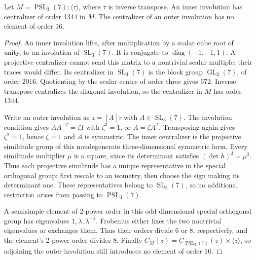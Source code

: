 \begin{lemma}\label{centralizers}
Let $M=\operatorname{PSL}_3(7):\langle\tau\rangle$, where
$\tau$ is inverse transpose. An inner involution has centralizer of
order 1344 in $M$. The centralizer of an outer involution has no
element of order 16.
\end{lemma}
\begin{proof}
An inner involution lifts, after multiplication by a scalar cube
root of unity, to an involution of $\operatorname{SL}_3(7)$. It is
conjugate to $\operatorname{diag}(-1,-1,1)$. A projective centralizer
cannot send this matrix to a nontrivial scalar multiple: their traces
would differ. Its centralizer in $\operatorname{SL}_3(7)$ is the block
group $\operatorname{GL}_2(7)$, of order 2016. Quotienting by the
scalar centre of order three gives 672. Inverse transpose centralizes
the diagonal involution, so the centralizer in $M$ has order 1344.

Write an outer involution as $z=[A]\tau$ with $A\in
\operatorname{SL}_3(7)$. The involution condition gives
$AA^{-T}=\zeta I$ with $\zeta^3=1$, or $A=\zeta A^T$.
Transposing again gives $\zeta^2=1$, hence $\zeta=1$ and $A$ is
symmetric. The inner centralizer is the projective similitude group
of this nondegenerate three-dimensional symmetric form. Every
similitude multiplier $\mu$ is a square, since its determinant
satisfies $(\det h)^2=\mu^3$. Thus each projective similitude has a
unique representative in the special orthogonal group: first rescale
to an isometry, then choose the sign making its determinant one.
These representatives belong to $\operatorname{SL}_3(7)$, so no
additional restriction arises from passing to $\operatorname{PSL}_3(7)$.

A semisimple element of 2-power order in this odd-dimensional special
orthogonal group has eigenvalues $1,\lambda,\lambda^{-1}$. Frobenius
either fixes the two nontrivial eigenvalues or exchanges them. Thus
their orders divide 6 or 8, respectively, and the element's 2-power
order divides 8. Finally $C_M(z)=C_{\operatorname{PSL}_3(7)}(z)
\times\langle z\rangle$, so adjoining the outer involution still
introduces no element of order 16.
\end{proof}
